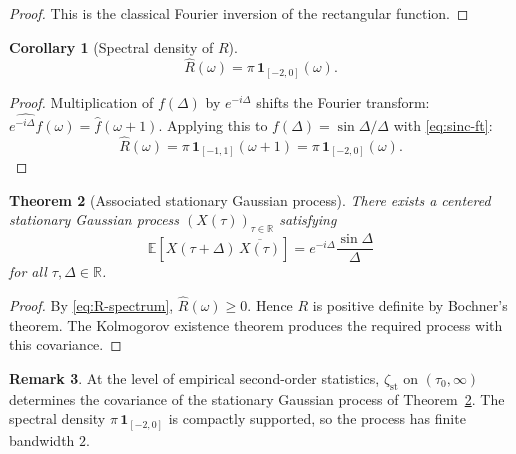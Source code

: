 \documentclass[11pt]{article}
\numberwithin{equation}{section}
\theoremstyle{plain}
\newtheorem{theorem}{Theorem}[section]
\newtheorem{corollary}[theorem]{Corollary}
\theoremstyle{definition}
\newtheorem{remark}[theorem]{Remark}
\begin{document}
\begin{proof}
This is the classical Fourier inversion of the rectangular function.
\end{proof}

\begin{corollary}[Spectral density of \(R\)]
\begin{equation}
\widehat{R}(\omega)=\pi\,\mathbf{1}_{[-2,0]}(\omega).
\label{eq:R-spectrum}
\end{equation}
\end{corollary}

\begin{proof}
Multiplication of \(f(\Delta)\) by \(e^{-i\Delta}\) shifts the Fourier transform:
\(\widehat{e^{-i\Delta}f}(\omega)=\widehat{f}(\omega+1)\). Applying this to
\(f(\Delta)=\sin\Delta/\Delta\) with \eqref{eq:sinc-ft}:
\[
\widehat{R}(\omega)=\pi\,\mathbf{1}_{[-1,1]}(\omega+1)=\pi\,\mathbf{1}_{[-2,0]}(\omega).
\]
\end{proof}

\begin{theorem}[Associated stationary Gaussian process]
\label{thm:gaussian}
There exists a centered stationary Gaussian process \((X(\tau))_{\tau\in\mathbb{R}}\)
satisfying
\[
\mathbb{E}\!\left[X(\tau+\Delta)\,\overline{X(\tau)}\right]
=e^{-i\Delta}\frac{\sin\Delta}{\Delta}
\]
for all \(\tau,\Delta\in\mathbb{R}\).
\end{theorem}

\begin{proof}
By \eqref{eq:R-spectrum}, \(\widehat{R}(\omega)\ge0\). Hence \(R\) is positive definite
by Bochner's theorem. The Kolmogorov existence theorem produces the required process
with this covariance.
\end{proof}

\begin{remark}
At the level of empirical second-order statistics, \(\zeta_{\mathrm{st}}\) on
\((\tau_0,\infty)\) determines the covariance of the stationary Gaussian process
of Theorem~\ref{thm:gaussian}. The spectral density \(\pi\,\mathbf{1}_{[-2,0]}\) is
compactly supported, so the process has finite bandwidth \(2\).
\end{remark}
\end{document}
